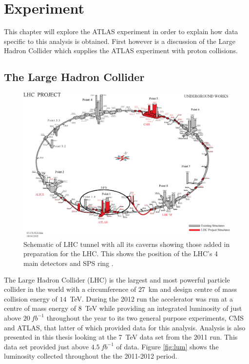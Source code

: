 \chapter{Experiment}

	This chapter will explore the ATLAS experiment in order to explain how data specific to this analysis is obtained. First however is a discussion of the Large Hadron Collider which supplies the ATLAS experiment with proton collisions.

\section{The Large Hadron Collider}

	\begin{figure}[h!]
        \begin{center}
            \includegraphics[scale=0.6]{images/LHCUnder.eps}
        \end{center}
        \caption{Schematic of LHC tunnel with all its caverns showing those added in preparation for the LHC. This shows the position of the LHC's 4 main detectors and SPS ring \cite{1367-2630-9-9-335}.}
        \label{fig:experimentLHC}
    \end{figure}

	The Large Hadron Collider (LHC) \cite{Brüning:782076} is the largest and most powerful particle collider in the world with a circumference of $27$~km and design centre of mass collision energy of $14$~TeV. During the 2012 run the accelerator was run at a centre of mass energy of $8$~TeV while providing an integrated luminosity of just above $20~fb^{-1}$ throughout the year to its two general purpose experiments, CMS and ATLAS, that latter of which provided data for this analysis. Analysis is also presented in this thesis looking at the 7~TeV data set from the 2011 run. This data set provided just above $4.5~fb^{-1}$ of data. Figure \ref{fig:lum} shows the luminosity collected throughout the the 2011-2012 period. 

